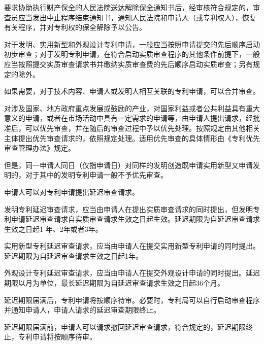 要求协助执行财产保全的人民法院送达解除保全通知书后，经审核符合规定的，审查员应当发出中止程序结束通知书，通知人民法院和申请人（或专利权人），恢复有关程序，并对专利权的保全解除予以公告。

对于发明、实用新型和外观设计专利申请，一般应当按照申请提交的先后顺序启动初步审查；对于发明专利申请，在符合启动实质审查程序的其他条件前提下，一般应当按照提交实质审查请求书并缴纳实质审查费的先后顺序启动实质审查；另有规定的除外。


如果需要，对于技术内容、申请人或发明人相互关联的专利申请，可以合并审查。

对涉及国家、地方政府重点发展或鼓励的产业，对国家利益或者公共利益具有重大意义的申请，或者在市场活动中具有一定需求的申请等，由申请人提出请求，经批准后，可以优先审查，并在随后的审查过程中予以优先处理。按照规定由其他相关主体提出优先审查请求的，依照规定处理。适用优先审查的具体情形由《专利优先审查管理办法》规定。

但是，同一申请人同日（仅指申请日）对同样的发明创造既申请实用新型又申请发明的，对于其中的发明专利申请一般不予优先审查。


申请人可以对专利申请提出延迟审查请求。

发明专利延迟审查请求，应当由申请人在提出实质审查请求的同时提出，但发明专利申请延迟审查请求自实质审查请求生效之日起生效。延迟期限为自延迟审查请求生效之日起1 年、2年或者3年。

实用新型专利延迟审查请求，应当由申请人在提交实用新型专利申请的同时提出。延迟期限为自延迟审查请求生效之日起1年。

外观设计专利延迟审查请求，应当由申请人在提交外观设计申请的同时提出。延迟期限以月为单位，最长延迟期限为自延迟审查请求生效之日起36个月。

延迟期限届满后，专利申请将按顺序待审。必要时，专利局可以自行启动审查程序并通知申请人，申请人请求的延迟审查期限终止。

延迟期限届满前，申请人可以请求撤回延迟审查请求，符合规定的，延迟期限终止，专利申请将按顺序待审。

